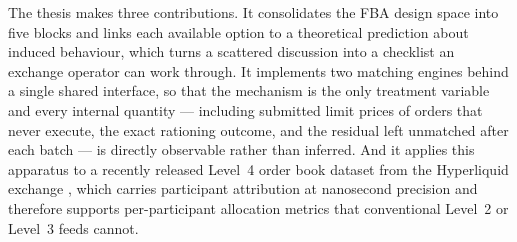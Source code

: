 The thesis makes three contributions. It consolidates the FBA design
space into five blocks and links each available option to a theoretical
prediction about induced behaviour, which turns a scattered discussion
into a checklist an exchange operator can work through. It implements
two matching engines behind a single shared interface, so that the
mechanism is the only treatment variable and every internal quantity ---
including submitted limit prices of orders that never execute, the exact
rationing outcome, and the residual left unmatched after each batch ---
is directly observable rather than inferred. And it applies this
apparatus to a recently released Level~4 order book dataset from the
Hyperliquid exchange \citep{albers2026openbook}, which carries
participant attribution at nanosecond precision and therefore supports
per-participant allocation metrics that conventional Level~2 or Level~3
feeds cannot.


